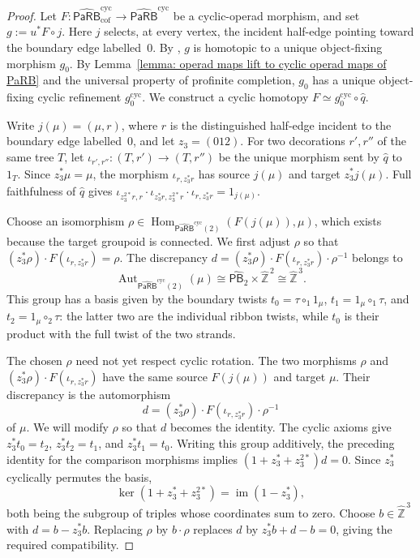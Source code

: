 \documentclass{amsart}
\newcommand{\PaRB}{\mathsf{PaRB}}
\newcommand{\Hom}{\operatorname{Hom}}
\newcommand{\Aut}{\operatorname{Aut}}
\newcommand{\PB}{\mathsf{PB}} %
\theoremstyle{definition}
\numberwithin{equation}{section}
\begin{document}
\begin{proof}
Let $F\colon\widehat{\PaRB}_{\mathrm{cof}}^{\mathrm{cyc}}
\to\widehat{\PaRB}^{\mathrm{cyc}}$ be a cyclic-operad morphism,
and set $g:=u^*F\circ j$. Here $j$ selects, at every vertex, the
incident half-edge pointing toward the boundary edge labelled~$0$.
By \cite[Proposition~8.1]{Boavida-Horel-Robertson}, $g$ is homotopic
to a unique object-fixing morphism $g_0$. By
Lemma~\ref{lemma: operad maps lift to cyclic operad maps of PaRB}
and the universal property of profinite completion, $g_0$ has a
unique object-fixing cyclic refinement $g_0^{\mathrm{cyc}}$.
We construct a cyclic homotopy
$F\simeq g_0^{\mathrm{cyc}}\circ\widehat q$.

Write $j(\mu)=(\mu,r)$, where $r$ is the distinguished half-edge incident to the boundary edge labelled~$0$, and let $z_3=(012)$. For two decorations $r',r''$ of the same tree $T$, let $\iota_{r',r''}\colon(T,r')\to(T,r'')$ be the unique morphism sent by $\widehat q$ to $1_T$. Since $z_3^*\mu=\mu$, the morphism $\iota_{r,z_3^*r}$ has source $j(\mu)$ and target $z_3^*j(\mu)$. Full faithfulness of $\widehat q$ gives $\iota_{z_3^{2*}r,r}\cdot\iota_{z_3^*r,z_3^{2*}r} \cdot\iota_{r,z_3^*r}=1_{j(\mu)}$.

Choose an isomorphism $\rho\in\Hom_{\widehat{\PaRB}^{\mathrm{cyc}}(2)}(F(j(\mu)),\mu)$, which exists because the target groupoid is
connected. We first adjust $\rho$ so that $(z_3^*\rho)\cdot F(\iota_{r,z_3^*r})=\rho$. The discrepancy $d=(z_3^*\rho)\cdot F(\iota_{r,z_3^*r})\cdot\rho^{-1}$
belongs to
\[
\Aut_{\widehat{\PaRB}^{\mathrm{cyc}}(2)}(\mu) \cong\widehat{\PB}_2\times\widehat{\mathbb Z}^{\,2} \cong\widehat{\mathbb Z}^{\,3}.
\]
This group has a basis given by the boundary twists $t_0=\tau\circ_1 1_\mu$, $t_1=1_\mu\circ_1\tau$, and $t_2=1_\mu\circ_2\tau$: the latter two are the individual ribbon twists, while $t_0$ is their product with the full twist of the two strands. 

The chosen $\rho$ need not yet respect cyclic rotation. The two morphisms $\rho$ and $(z_3^*\rho)\cdot F(\iota_{r,z_3^*r})$ have the same source $F(j(\mu))$ and target $\mu$. Their discrepancy is the automorphism
\[
d=(z_3^*\rho)\cdot F(\iota_{r,z_3^*r})\cdot\rho^{-1}
\]
of $\mu$. We will modify $\rho$ so that $d$ becomes the identity. The cyclic axioms give $z_3^*t_0=t_2$, $z_3^*t_2=t_1$, and $z_3^*t_1=t_0$. Writing this group additively, the preceding identity for the comparison morphisms implies $(1+z_3^*+z_3^{2*})d=0$. Since $z_3^*$ cyclically permutes the
basis,
\[
\ker(1+z_3^*+z_3^{2*})=\operatorname{im}(1-z_3^*),
\]
both being the subgroup of triples whose coordinates sum to zero. Choose $b\in\widehat{\mathbb Z}^{\,3}$ with $d=b-z_3^*b$. Replacing $\rho$ by $b\cdot\rho$ replaces $d$ by $z_3^*b+d-b=0$, giving the required compatibility.


\end{proof}
\end{document}
